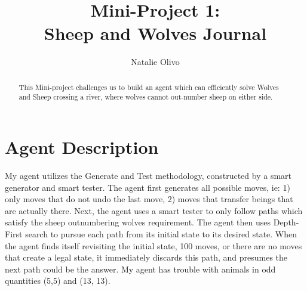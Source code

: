 \documentclass[
	letterpaper, %
]{jdf}
\author{Natalie Olivo}
\title{Mini-Project 1:\\Sheep and Wolves Journal}
\begin{document}

\maketitle

\begin{abstract}
This Mini-project challenges us to build an agent which can efficiently solve Wolves and Sheep crossing a river, where wolves cannot out-number sheep on either side.
\\
\end{abstract}

\section{Agent Description}
My agent utilizes the Generate and Test methodology, constructed by a smart generator and smart tester. The agent first generates all possible moves, ie: 1) only moves that do not undo the last move, 2) moves that transfer beings that are actually there. Next, the agent uses a smart tester to only follow paths which satisfy the sheep outnumbering wolves requirement. The agent then uses Depth-First search to pursue each path from its initial state to its desired state. When the agent finds itself revisiting the initial state, 100 moves, or there are no moves that create a legal state, it immediately discards this path, and presumes the next path could be the answer. My agent has trouble with animals in odd quantities (5,5) and (13, 13).
\end{document}
